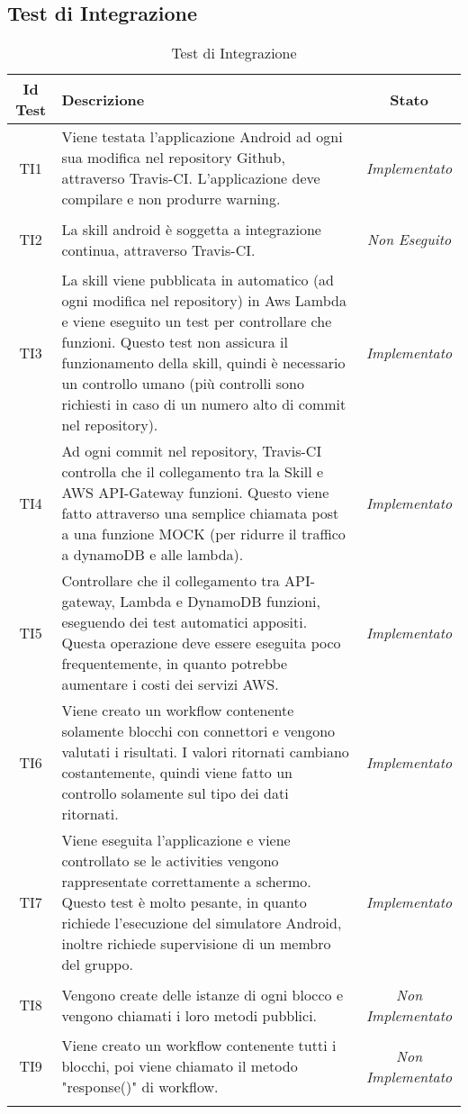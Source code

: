 \subsection{Test di Integrazione}
\normalsize
\begin{longtable}{|c|>{}m{8cm}|c|}
\hline 
\textbf{Id Test} & \textbf{Descrizione} & \textbf{Stato}\\
\hline
\endhead
\hypertarget{TI1}{TI1} & Viene testata l'applicazione Android ad ogni sua modifica nel repository Github, attraverso Travis-CI. L'applicazione deve compilare e non produrre warning. & \textit{Implementato}\\ \hline
\hypertarget{TI2}{TI2} & La skill android è soggetta a integrazione continua, attraverso Travis-CI. & \textit{Non Eseguito}\\ \hline
\hypertarget{TI3}{TI3} & La skill viene pubblicata in automatico (ad ogni modifica nel repository) in Aws Lambda e viene eseguito un test per controllare che funzioni. Questo test non assicura il funzionamento della skill, quindi è necessario un controllo umano (più controlli sono richiesti in caso di un numero alto di commit nel repository). & \textit{Implementato}\\ \hline
\hypertarget{TI4}{TI4} & Ad ogni commit nel repository, Travis-CI controlla che il collegamento tra la Skill e AWS API-Gateway funzioni. Questo viene fatto attraverso una semplice chiamata post a una funzione MOCK (per ridurre il traffico a dynamoDB e alle lambda). & \textit{Implementato}\\ \hline
\hypertarget{TI5}{TI5} & Controllare che il collegamento tra API-gateway, Lambda e DynamoDB funzioni, eseguendo dei test automatici appositi. Questa operazione deve essere eseguita poco frequentemente, in quanto potrebbe aumentare i costi dei servizi AWS. & \textit{Implementato}\\ \hline
\hypertarget{TI6}{TI6} & Viene creato un workflow contenente solamente blocchi con connettori e vengono valutati i risultati. I valori ritornati cambiano costantemente, quindi viene fatto un controllo solamente sul tipo dei dati ritornati. & \textit{Implementato}\\ \hline
\hypertarget{TI7}{TI7} & Viene eseguita l'applicazione e viene controllato se le activities vengono rappresentate correttamente a schermo. Questo test è molto pesante, in quanto richiede l'esecuzione del simulatore Android, inoltre richiede supervisione di un membro del gruppo. & \textit{Implementato}\\ \hline
\hypertarget{TI8}{TI8} & Vengono create delle istanze di ogni blocco e vengono chiamati i loro metodi pubblici. & \textit{Non Implementato}\\ \hline
\hypertarget{TI9}{TI9} & Viene creato un workflow contenente tutti i blocchi, poi viene chiamato il metodo "response()" di workflow. & \textit{Non Implementato}\\ \hline
\caption[Test di Integrazione]{Test di Integrazione}
\label{tabella:test2}
\end{longtable}
\clearpage

